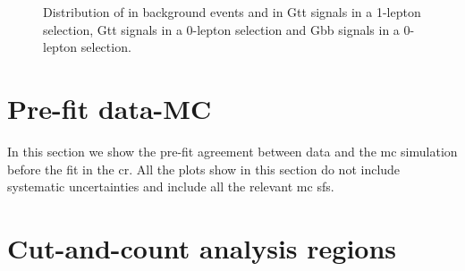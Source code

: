 \begin{figure}[h]
\centering 
{}
\caption{Distribution of \met in  background events and in  Gtt signals in a 1-lepton selection, 
 Gtt signals in a  0-lepton selection
 and  Gbb signals in a  0-lepton selection.
}\label{fig:strong:sig:met}
\end{figure}


\section{Pre-fit data-MC}

In this section we show the pre-fit agreement between data and the \gls{mc} simulation before the fit in the \gls{cr}. 
All the plots show in this section do not include systematic uncertainties and include all the relevant \gls{mc} \glspl{sf}. 

\section{Cut-and-count analysis regions}

